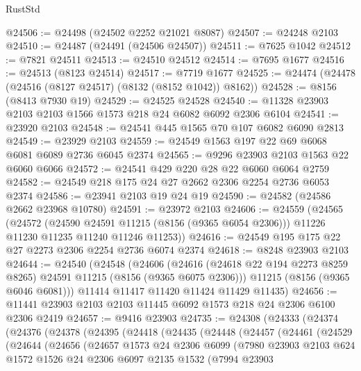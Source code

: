 \begin{lexlean}{RustStd}
\begin{coremodule}
@24506 := @24498 (@24502 @2252 @21021 @8087)
@24507 := @24248 @2103
@24510 := @24487 (@24491 (@24506 @24507))
@24511 := @7625 @1042
@24512 := @7821 @24511
@24513 := @24510 @24512
@24514 := @7695 @1677
@24516 := @24513 (@8123 @24514)
@24517 := @7719 @1677
@24525 := @24474 (@24478 (@24516 (@8127 @24517) (@8132 (@8152 @1042)) @8162))
@24528 := @8156 (@8413 @7930 @19)
@24529 := @24525 @24528
@24540 := @11328 @23903 @2103 @2103 @1566 @1573 @218 @24 @6082 @6092 @2306 @6104
@24541 := @23920 @2103
@24548 := @24541 @445 @1565 @70 @107 @6082 @6090 @2813
@24549 := @23929 @2103
@24559 := @24549 @1563 @197 @22 @69 @6068 @6081 @6089 @2736 @6045 @2374
@24565 := @9296 @23903 @2103 @1563 @22 @6060 @6066
@24572 := @24541 @429 @220 @28 @22 @6060 @6064 @2759
@24582 := @24549 @218 @175 @24 @27 @2662 @2306 @2254 @2736 @6053 @2374
@24586 := @23941 @2103 @19 @24 @19
@24590 := @24582 (@24586 @2662 @23968 @10780)
@24591 := @23972 @2103
@24606 := @24559
    (@24565
      (@24572
        (@24590 @24591 @11215 (@8156 (@9365 @6054 @2306)))
        @11226
        @11230
        @11235
        @11240
        @11246
        @11253))
@24616 := @24549 @195 @175 @22 @27 @2273 @2306 @2254 @2736 @6074 @2374
@24618 := @8248 @23903 @2103
@24644 := @24540
    (@24548
      (@24606
        (@24616 (@24618 @22 @194 @2273 @8259 @8265) @24591 @11215 (@8156 (@9365 @6075 @2306)))
        @11215
        (@8156 (@9365 @6046 @6081)))
      @11414
      @11417
      @11420
      @11424
      @11429
      @11435)
@24656 := @11441 @23903 @2103 @2103 @11445 @6092 @1573 @218 @24 @2306 @6100 @2306 @2419
@24657 := @9416 @23903
@24735 := @24308
    (@24333
      (@24374
        (@24376
          (@24378
            (@24395
              (@24418
                (@24435
                  (@24448
                    (@24457
                      (@24461
                        (@24529
                          (@24644
                            (@24656
                              (@24657
                                @1573
                                @24
                                @2306
                                @6099
                                (@7980
                                  @23903
                                  @2103
                                  @624
                                  @1572
                                  @1526
                                  @24
                                  @2306
                                  @6097
                                  @2135
                                  @1532
                                  (@7994
                                    @23903

\end{coremodule}
\end{lexlean}
